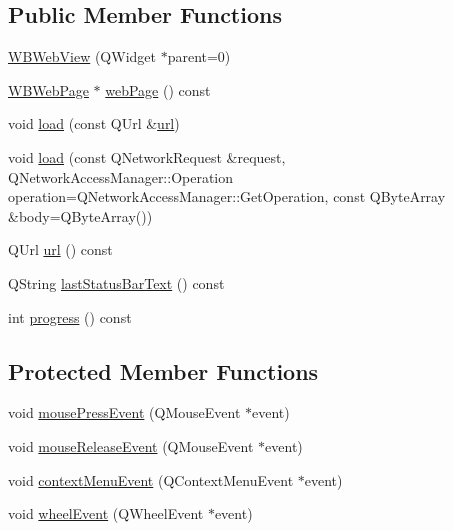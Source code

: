 \subsection*{Public Member Functions}
\begin{DoxyCompactItemize}
\item 
\hyperlink{class_w_b_web_view_a38d6dace641501c2c5b071cc31c14cfa}{W\-B\-Web\-View} (Q\-Widget $\ast$parent=0)
\item 
\hyperlink{class_w_b_web_page}{W\-B\-Web\-Page} $\ast$ \hyperlink{class_w_b_web_view_aecf1ef7040499bd62e914632ed039e34}{web\-Page} () const 
\item 
void \hyperlink{class_w_b_web_view_a4832fbab411c1e46c4c00c4300dd9a50}{load} (const Q\-Url \&\hyperlink{class_w_b_web_view_ab5ff00bb93aa2e434fc1ab98c7add3ee}{url})
\item 
void \hyperlink{class_w_b_web_view_a25047c2dfbb0aba6efcc5e3c820bb54f}{load} (const Q\-Network\-Request \&request, Q\-Network\-Access\-Manager\-::\-Operation operation=Q\-Network\-Access\-Manager\-::\-Get\-Operation, const Q\-Byte\-Array \&body=Q\-Byte\-Array())
\item 
Q\-Url \hyperlink{class_w_b_web_view_ab5ff00bb93aa2e434fc1ab98c7add3ee}{url} () const 
\item 
Q\-String \hyperlink{class_w_b_web_view_a2fa08768c1808fe832eb67b684d099c2}{last\-Status\-Bar\-Text} () const 
\item 
int \hyperlink{class_w_b_web_view_aeb2913d83da4ef918fb845693aeebb8c}{progress} () const 
\end{DoxyCompactItemize}
\subsection*{Protected Member Functions}
\begin{DoxyCompactItemize}
\item 
void \hyperlink{class_w_b_web_view_a4502e55d3975d0a2148c77c0c0120ba0}{mouse\-Press\-Event} (Q\-Mouse\-Event $\ast$event)
\item 
void \hyperlink{class_w_b_web_view_afd03faef9b36faf923f870674a02c522}{mouse\-Release\-Event} (Q\-Mouse\-Event $\ast$event)
\item 
void \hyperlink{class_w_b_web_view_a8b69293de82d06c4f8124fce9cca4443}{context\-Menu\-Event} (Q\-Context\-Menu\-Event $\ast$event)
\item 
void \hyperlink{class_w_b_web_view_ad8377dbf7e39f714010069c1c38b4321}{wheel\-Event} (Q\-Wheel\-Event $\ast$event)
\end{DoxyCompactItemize}
